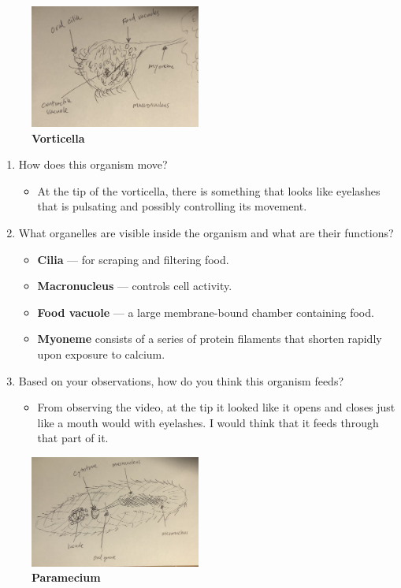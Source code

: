\documentclass[a4paper]{article}
\begin{document}
\begin{figure}[h]
  \centering
  \includegraphics[width=0.5\textwidth]{vorticella.jpeg}
  \caption{\textbf{Vorticella}}
\end{figure}
\begin{enumerate}
	\item How does this organism move?
	\begin{itemize}
    \item At the tip of the vorticella, there is something that looks like eyelashes that is pulsating and possibly controlling its movement.
  \end{itemize}
	\item What organelles are visible inside the organism and what are their functions?
	\begin{itemize}
    \item \textbf{Cilia} — for scraping and filtering food.
    \item \textbf{Macronucleus} — controls cell activity.
    \item \textbf{Food vacuole} — a large membrane-bound chamber containing food.
    \item \textbf{Myoneme} consists of a series of protein filaments that shorten rapidly upon exposure to calcium.
  \end{itemize}
	\item Based on your observations, how do you think this organism feeds?
	\begin{itemize}
    \item From observing the video, at the tip it looked like it opens and closes just like a mouth would with eyelashes. I would think that it feeds through that part of it.
  \end{itemize}
\end{enumerate}
\newpage
\begin{figure}[h]
  \centering
  \includegraphics[width=0.5\textwidth]{paramecium.jpeg}
  \caption{\textbf{Paramecium}}
\end{figure}
\end{document}
